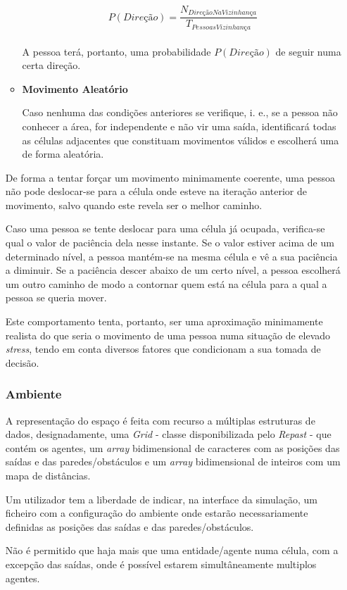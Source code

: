 \documentclass[12pt]{article}
\begin{document}
\begin{titlepage}
\begin{itemize}
\begin{itemize}
\[P(Direção) = \frac{N_{DireçãoNaVizinhança}}{T_{PessoasVizinhança}}\]\\

A pessoa terá, portanto, uma probabilidade \(P(Direção)\) de seguir numa certa direção.

\item \textbf{Movimento Aleatório}

Caso nenhuma das condições anteriores se verifique, i. e., se a pessoa não conhecer a área, for independente e não vir uma saída, identificará todas as células adjacentes que constituam movimentos válidos e escolherá uma de forma aleatória. 

\end{itemize}

De forma a tentar forçar um movimento minimamente coerente, uma pessoa não pode deslocar-se para a célula onde esteve na iteração anterior de movimento, salvo quando este revela ser o melhor caminho.

Caso uma pessoa se tente deslocar para uma célula já ocupada, verifica-se qual o valor de paciência dela nesse instante. Se o valor estiver acima de um determinado nível, a pessoa mantém-se na mesma célula e vê a sua paciência a diminuir. Se a paciência descer abaixo de um certo nível, a pessoa escolherá um outro caminho de modo a contornar quem está na célula para a qual a pessoa se queria mover.

Este comportamento tenta, portanto, ser uma aproximação minimamente realista do que seria o movimento de uma pessoa numa situação de elevado \textit{stress}, tendo em conta diversos fatores que condicionam a sua tomada de decisão.


\subsubsection{Ambiente}
A representação do espaço é feita com recurso a múltiplas estruturas de dados, designadamente, uma \textit{Grid} - classe disponibilizada pelo \textit{Repast} - que contém os agentes, um \textit{array} bidimensional de caracteres com as posições das saídas e das paredes/obstáculos e um \textit{array} bidimensional de inteiros com um mapa de distâncias. 

Um utilizador tem a liberdade de indicar, na interface da simulação, um ficheiro com a configuração do ambiente onde estarão necessariamente definidas as posições das saídas e das paredes/obstáculos.

Não é permitido que haja mais que uma entidade/agente numa célula, com a excepção das saídas, onde é possível estarem simultâneamente multiplos agentes.


\end{itemize}
\end{titlepage}
\end{document}
